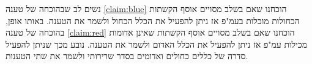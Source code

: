 נשים לב שבהוכחה של טענה 
\ref{claim:blue}
הוכחנו שאם בשלב מסויים אוסף הקשתות הכחולות מוכלות בעמ"פ אז ניתן להפעיל את הכלל הכחול
ולשמר את הטענה.
באותו אופן, בהוכחה של טענה
\ref{claim:red}
הוכחנו שאם בשלב מסויים אוסף הקשתות שאינן אדומות מכילות עמ"פ אז ניתן להפעיל את הכלל האדום
ולשמר את הטענה.
נובע מכך שניתן להפעיל סדרה של כללים כחולים ואדומים בסדר שרירותי ולשמר את שתי הטענות.

